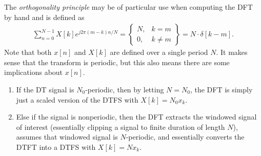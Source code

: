 \documentclass{report}
\begin{document}
The \emph{orthogonality principle} may be of particular use when computing the DFT by hand and is defined as 
\begin{align}
    \sum_{n=0}^{N-1} X[k] e^{j2\pi (m-k)n/N} = \left\{
    \begin{matrix}
        N, & k = m \\
        0, & k\neq m
    \end{matrix} \right\} = N\cdot\delta[k-m].
\end{align}
Note that both $x[n]$ and $X[k]$ are defined over a single period $N$. It makes sense that the transform 
is periodic, but this also means there are some implications about $x[n]$.

\begin{tcolorbox}[width=\textwidth,colback={white}, sharp corners]
    \begin{enumerate}
        \item If the DT signal is $N_0$-periodic, then by letting $N=N_0$, the DFT is simply just a scaled version of the DTFS with $X[k]=N_0 x_k$.
        \item Else if the signal is nonperiodic, then the DFT extracts the windowed signal of interest (essentially clipping a signal to finite duration of length $N$), assumes that 
        windowed signal is $N$-periodic, and essentially converts the DTFT into a DTFS with $X[k]=N x_k$.
    \end{enumerate}
\end{tcolorbox}
\end{document}
